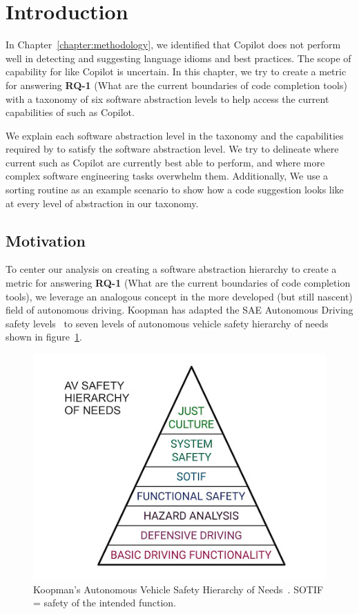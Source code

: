 \label{chapter:framework}

\section{Introduction}
In Chapter~\ref{chapter:methodology}, we identified that Copilot does not perform well in detecting and suggesting language idioms and best practices.
The scope of capability for \cct{} like Copilot is uncertain. 
In this chapter, we try to create a metric for answering \textbf{RQ-1} (What are the current boundaries of code completion tools) with a taxonomy of six software abstraction levels to help access the current capabilities of \cct{} such as Copilot. 

We explain each software abstraction level in the taxonomy and the capabilities required by \cct{} to satisfy the software abstraction level. 
We try to delineate where current \cct{} such as Copilot are currently best able to perform, and where more complex software engineering tasks overwhelm them. 
Additionally, We use a sorting routine as an example scenario to show how a \cct{} code suggestion looks like at every level of abstraction in our taxonomy.

\subsection{Motivation}
To center our analysis on creating a software abstraction hierarchy to create a metric for answering \textbf{RQ-1} (What are the current boundaries of code completion tools), 
we leverage an analogous concept in the more developed (but still nascent) field of autonomous driving. 
Koopman has adapted the SAE Autonomous Driving safety levels~\cite{sae} to seven levels of autonomous vehicle safety hierarchy of needs shown in figure~\ref{fig:koopman_pyramid}. 

\begin{figure}[hbt!]
    \centering
    \includegraphics[width=\linewidth]{Figures/koopman_pyramid.png}
    \caption{Koopman's Autonomous Vehicle Safety Hierarchy of Needs~\cite{koopman}. SOTIF = safety of the intended function.}
    \label{fig:koopman_pyramid}
\end{figure}

